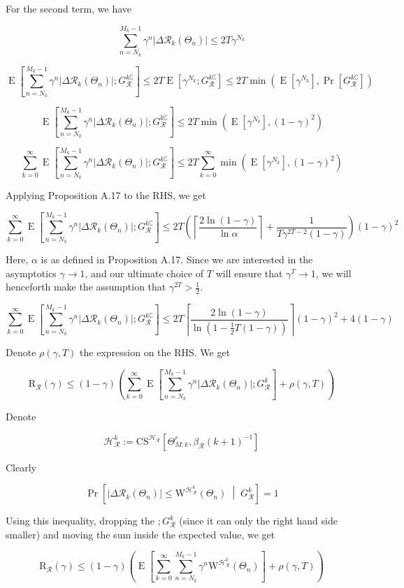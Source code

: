 \documentclass[a4paper]{article}
\newcommand{\AP}[1]{\left(#1\right)}
\newcommand{\AB}[1]{\left[#1\right]}
\newcommand{\ABM}[2]{\left[#1\;\middle\vert\;#2\right]}
\newcommand{\Abs}[1]{\left\vert #1 \right\vert}
\newcommand{\Ceil}[1]{\left\lceil #1 \right\rceil}
\newcommand{\Pb}[1]{\operatorname{Pr}\AB{#1}}
\newcommand{\CPb}[2]{\operatorname{Pr}\ABM{#1}{#2}}
\newcommand{\E}[1]{\operatorname{E}\AB{#1}}
\newcommand{\R}{\mathcal{R}}
\newcommand{\Hy}{\mathcal{H}}
\newcommand{\Reg}{\mathrm{R}}
\newcommand{\ET}{N}
\newcommand{\IT}{M}
\newcommand{\CSE}{G}
\newcommand{\CS}{\mathrm{CS}}
\newcommand{\W}{\mathrm{W}}
\begin{document}
For the second term, we have

$$\sum_{n=\ET_k}^{\IT_k-1}\gamma^{n}\Abs{\Delta\R_k\AP{\Theta_n}}\leq2T\gamma^{N_k}$$

$$\E{\sum_{n=\ET_k}^{\IT_k-1}\gamma^{n}\Abs{\Delta\R_k\AP{\Theta_n}};\CSE_\R^{k\complement}}\leq2T\E{\gamma^{N_k};\CSE_\R^{k\complement}}\leq2T\min\AP{\E{\gamma^{N_k}},\Pb{\CSE_\R^{k\complement}}}$$

$$\E{\sum_{n=\ET_k}^{\IT_k-1}\gamma^{n}\Abs{\Delta\R_k\AP{\Theta_n}};\CSE_\R^{k\complement}}\leq2T\min\AP{\E{\gamma^{N_k}},(1-\gamma)^2}$$

$$\sum_{k=0}^\infty\E{\sum_{n=\ET_k}^{\IT_k-1}\gamma^{n}\Abs{\Delta\R_k\AP{\Theta_n}};\CSE_\R^{k\complement}}\leq 2T\sum_{k=0}^\infty\min\AP{\E{\gamma^{N_k}},(1-\gamma)^2}$$

Applying Proposition A.17 to the RHS, we get

$$\sum_{k=0}^\infty\E{\sum_{n=\ET_k}^{\IT_k-1}\gamma^{n}\Abs{\Delta\R_k\AP{\Theta_n}};\CSE_\R^{k\complement}}\leq2T\AP{\Ceil{\frac{2\ln(1-\gamma)}{\ln\alpha}}+\frac{1}{T\gamma^{2T-2}(1-\gamma)}}(1-\gamma)^2$$

Here, $\alpha$ is as defined in Proposition A.17. Since we are interested in the asymptotics $\gamma\rightarrow1$, and our ultimate choice of $T$ will ensure that $\gamma^T\rightarrow1$, we will henceforth make the assumption that $\gamma^{2T}>\frac{1}{2}$.

$$\sum_{k=0}^\infty\E{\sum_{n=\ET_k}^{\IT_k-1}\gamma^{n}\Abs{\Delta\R_k\AP{\Theta_n}};\CSE_\R^{k\complement}}\leq2T\Ceil{\frac{2\ln(1-\gamma)}{\ln\AP{1-\frac{1}{2}T(1-\gamma)}}}(1-\gamma)^2+4(1-\gamma)$$

Denote $\rho(\gamma,T)$ the expression on the RHS. We get

$$\Reg_\R(\gamma)\leq(1-\gamma)\AP{\sum_{k=0}^\infty\E{\sum_{n=\ET_k}^{\IT_k-1}\gamma^{n}\Abs{\Delta\R_k\AP{\Theta_n}};\CSE_\R^k}+\rho(\gamma,T)}$$

Denote

$$\Hy_\R^k:=\CS^{\Hy_\R}\AB{\Theta_{M:k}^r,\beta_\R(k+1)^{-1}}$$

Clearly

$$\CPb{\Abs{\Delta\R_k\AP{\Theta_n}}\leq\W^{\Hy_\R^k}\AP{\Theta_n}}{\CSE_\R^k}=1$$

Using this inequality, dropping the $;G_\R^k$ (since it can only the right hand side smaller) and moving the sum inside the expected value, we get

$$\Reg_\R(\gamma)\leq(1-\gamma)\AP{\E{\sum_{k=0}^\infty\sum_{n=\ET_k}^{\IT_k-1}\gamma^{n}\W^{\Hy_\R^k}\AP{\Theta_n}}+\rho(\gamma,T)}$$
\end{document}
